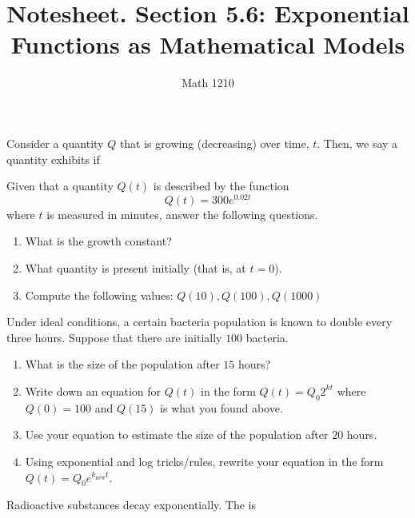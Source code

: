 \documentclass[12pt, a4paper]{article}
\author{Math 1210}
\title{Notesheet. Section 5.6: Exponential Functions as Mathematical Models}
\date{}
\begin{document}
\maketitle
\nameline
\begin{defi}
Consider a quantity \(Q\) that is growing (decreasing) over time,
\(t\). Then, we say a quantity exhibits  if
\end{defi}
\begin{ex}
  Given that a quantity \(Q(t)\) is described by the function \[
    Q(t) = 300 e^{0.02 t}
  \]
  where \(t\) is measured in minutes, answer the following questions.
  \begin{enumerate}
  \item What is the growth constant?
  \item What quantity is present initially (that is, at \(t=0\)).
  \item Compute the following values: \(Q(10), Q(100), Q(1000)\)
  \end{enumerate}
\end{ex}
\vspace{-0.8in}
\begin{ex}
  Under ideal conditions, a certain bacteria population is known to
  double every three hours. Suppose that there are initially \(100\)
  bacteria.
  \begin{enumerate}
  \item What is the size of the population after \(15\) hours?
    \vspace{0.75in}
  \item Write down an equation for \(Q(t)\) in the form \(Q(t) = Q_0
    2^{kt}\) where \(Q(0) = 100\) and \(Q(15)\) is what you found
    above.
    \vspace{0.75in}
  \item Use your equation to estimate the size of the population after
    \(20\) hours.
    \vspace{0.75in}
  \item Using exponential and log tricks/rules, rewrite your equation in the
    form \(Q(t) = Q_0 e^{k_{\text{new}} t}\).
    \vspace{0.75in}
  \end{enumerate}
\end{ex}
\vspace{-2in}
\begin{defi}
  Radioactive substances decay exponentially. The  is
\end{defi}
\end{document}
